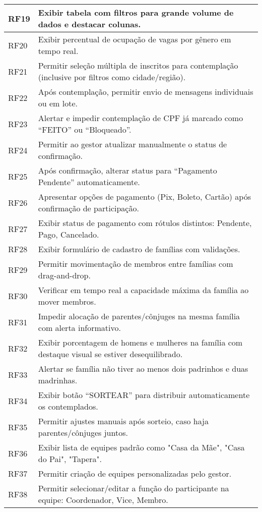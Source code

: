 \begin{longtable}{|p{4cm}|>{\raggedright\arraybackslash}p{\dimexpr\linewidth-4.2cm}|}
\hline
RF19 & Exibir tabela com filtros para grande volume de dados e destacar colunas. \\
\hline
RF20 & Exibir percentual de ocupação de vagas por gênero em tempo real. \\
\hline
RF21 & Permitir seleção múltipla de inscritos para contemplação (inclusive por filtros como cidade/região). \\
\hline
RF22 & Após contemplação, permitir envio de mensagens individuais ou em lote. \\
\hline
RF23 & Alertar e impedir contemplação de CPF já marcado como “FEITO” ou “Bloqueado”. \\
\hline
RF24 & Permitir ao gestor atualizar manualmente o status de confirmação. \\
\hline
RF25 & Após confirmação, alterar status para “Pagamento Pendente” automaticamente. \\
\hline
RF26 & Apresentar opções de pagamento (Pix, Boleto, Cartão) após confirmação de participação. \\
\hline
RF27 & Exibir status de pagamento com rótulos distintos: Pendente, Pago, Cancelado. \\
\hline
RF28 & Exibir formulário de cadastro de famílias com validações. \\
\hline
RF29 & Permitir movimentação de membros entre famílias com drag-and-drop. \\
\hline
RF30 & Verificar em tempo real a capacidade máxima da família ao mover membros. \\
\hline
RF31 & Impedir alocação de parentes/cônjuges na mesma família com alerta informativo. \\
\hline
RF32 & Exibir porcentagem de homens e mulheres na família com destaque visual se estiver desequilibrado. \\
\hline
RF33 & Alertar se família não tiver ao menos dois padrinhos e duas madrinhas. \\
\hline
RF34 & Exibir botão “SORTEAR” para distribuir automaticamente os contemplados. \\
\hline
RF35 & Permitir ajustes manuais após sorteio, caso haja parentes/cônjuges juntos. \\
\hline
RF36 & Exibir lista de equipes padrão como "Casa da Mãe", "Casa do Pai", "Tapera". \\
\hline
RF37 & Permitir criação de equipes personalizadas pelo gestor. \\
\hline
RF38 & Permitir selecionar/editar a função do participante na equipe: Coordenador, Vice, Membro. \\

\end{longtable}
